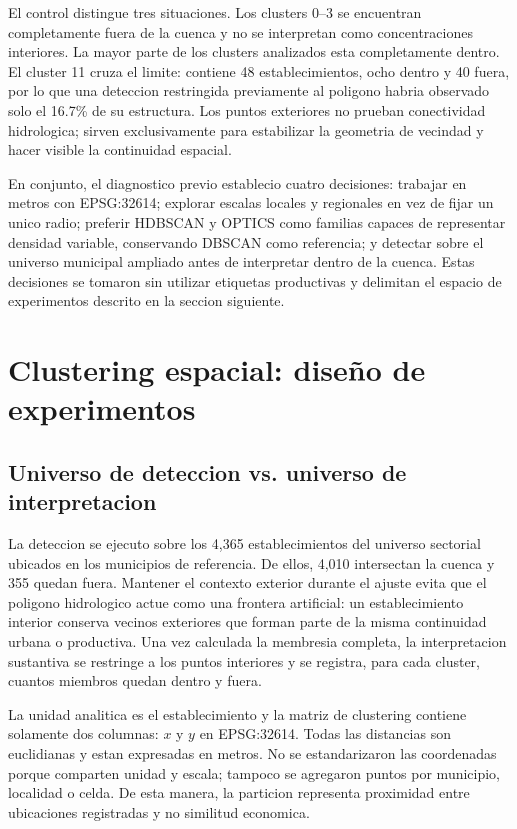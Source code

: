 \documentclass[11pt,letterpaper]{article}
\begin{document}
El control distingue tres situaciones. Los clusters 0--3 se encuentran completamente fuera de la cuenca y no se interpretan como concentraciones interiores. La mayor parte de los clusters analizados esta completamente dentro. El cluster 11 cruza el limite: contiene 48 establecimientos, ocho dentro y 40 fuera, por lo que una deteccion restringida previamente al poligono habria observado solo el 16.7\% de su estructura. Los puntos exteriores no prueban conectividad hidrologica; sirven exclusivamente para estabilizar la geometria de vecindad y hacer visible la continuidad espacial.

En conjunto, el diagnostico previo establecio cuatro decisiones: trabajar en metros con EPSG:32614; explorar escalas locales y regionales en vez de fijar un unico radio; preferir HDBSCAN y OPTICS como familias capaces de representar densidad variable, conservando DBSCAN como referencia; y detectar sobre el universo municipal ampliado antes de interpretar dentro de la cuenca. Estas decisiones se tomaron sin utilizar etiquetas productivas y delimitan el espacio de experimentos descrito en la seccion siguiente.

\section{Clustering espacial: diseño de experimentos}

\subsection{Universo de deteccion vs. universo de interpretacion}
La deteccion se ejecuto sobre los 4,365 establecimientos del universo sectorial ubicados en los municipios de referencia. De ellos, 4,010 intersectan la cuenca y 355 quedan fuera. Mantener el contexto exterior durante el ajuste evita que el poligono hidrologico actue como una frontera artificial: un establecimiento interior conserva vecinos exteriores que forman parte de la misma continuidad urbana o productiva. Una vez calculada la membresia completa, la interpretacion sustantiva se restringe a los puntos interiores y se registra, para cada cluster, cuantos miembros quedan dentro y fuera.

La unidad analitica es el establecimiento y la matriz de clustering contiene solamente dos columnas: $x$ y $y$ en EPSG:32614. Todas las distancias son euclidianas y estan expresadas en metros. No se estandarizaron las coordenadas porque comparten unidad y escala; tampoco se agregaron puntos por municipio, localidad o celda. De esta manera, la particion representa proximidad entre ubicaciones registradas y no similitud economica.
\end{document}

